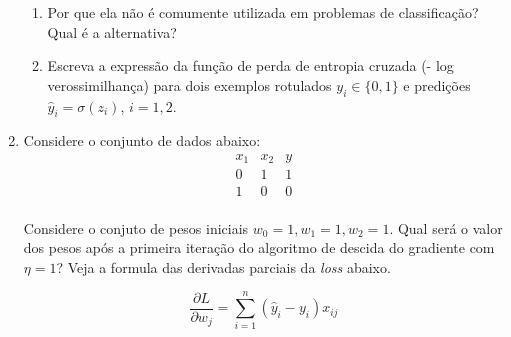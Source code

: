 \documentclass[12pt]{article}
\begin{document}
\begin{enumerate}
    \begin{enumerate}
        \item Por que ela não é comumente utilizada em problemas de classificação? Qual é a alternativa? 
        \item Escreva a expressão da função de perda de entropia cruzada (- log verossimilhança) para dois exemplos rotulados \(y_i \in \{0, 1\}\) e predições \(\hat{y}_i = \sigma(z_i)\), \(i = 1, 2\).
    \end{enumerate}
  
  \item Considere o conjunto de dados abaixo:
  \[
  \begin{array}{ccc}
    x_1 & x_2 & y \\
    \hline
    0 & 1 & 1 \\
    1 & 0 & 0 \\
  \end{array}
  \]
  
  Considere o conjuto de pesos iniciais \(w_0 = 1, w_1 = 1, w_2 = 1\). Qual será o valor dos pesos após a primeira iteração do algoritmo de descida do gradiente com $\eta = 1$? Veja a formula das derivadas parciais da \textit{loss} abaixo.
  
  \[
    \frac{\partial L}{\partial w_j} = \sum_{i=1}^{n} \left( \hat{y}_i - y_i \right) x_{ij}
    \]

\end{enumerate}

  
\end{document}
